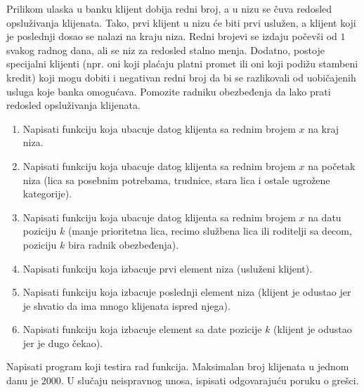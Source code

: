 \ifresenja
\begin{Answer}[ref=p.unija_presek_razlika]
\end{Answer}
\fi


\begin{Exercise}[label=izbacivanje_ubacivanje_u_niz] 
Prilikom ulaska u banku klijent dobija redni broj, a u nizu se čuva
redosled opsluživanja klijenata. Tako, prvi klijent u nizu će biti
prvi uslužen, a klijent koji je poslednji dosao se nalazi na kraju
niza. Redni brojevi se izdaju počevši od $1$ svakog radnog dana, ali
se niz za redosled stalno menja. Dodatno, postoje specijalni klijenti
(npr. oni koji plaćaju platni promet ili oni koji podižu stambeni
kredit) koji mogu dobiti i negativan redni broj da bi se razlikovali
od uobičajenih usluga koje banka omogućava. Pomozite radniku
obezbeđenja da lako prati redosled opsluživanja klijenata.
\begin{enumerate}
\item Napisati funkciju koja ubacuje datog klijenta sa rednim brojem
  $x$ na kraj niza.
\item Napisati funkciju koja ubacuje datog klijenta sa rednim brojem
  $x$ na početak niza (lica sa posebnim potrebama, trudnice, stara
  lica i ostale ugrožene kategorije).
\item Napisati funkciju koja ubacuje datog klijenta sa rednim brojem
  $x$ na datu poziciju $k$ (manje prioritetna lica, recimo službena
  lica ili roditelji sa decom, poziciju $k$ bira radnik obezbeđenja).
\item Napisati funkciju koja izbacuje prvi element niza (usluženi
  klijent).
\item Napisati funkciju koja izbacuje poslednji element niza (klijent
  je odustao jer je shvatio da ima mnogo klijenata ispred njega).
\item Napisati funkciju koja izbacuje element sa date pozicije $k$
  (klijent je odustao jer je dugo čekao).
\end{enumerate}
Napisati program koji testira rad funkcija. Maksimalan broj klijenata
u jednom danu je $2000$.
U slučaju neispravnog unosa, ispisati odgovarajuću poruku o grešci. 


\end{Exercise}
